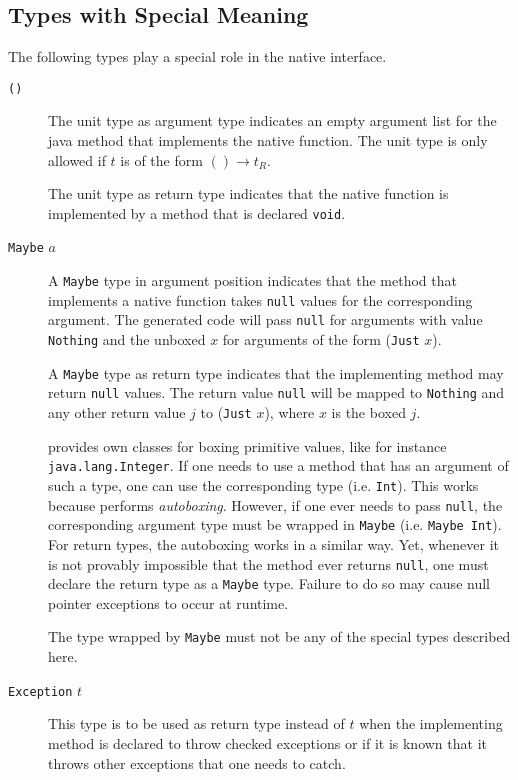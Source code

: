 \subsection*{Types with Special Meaning}

The following types play a special role in the native interface.

\begin{description}
\item[\texttt{()}] The unit type as argument type indicates an empty argument list for the java method that implements the native function. The unit type is only allowed if $t$ is of the form $() \rightarrow t_R$.

The unit type as return type indicates that the native function is implemented by a \java{} method that is declared \texttt{void}.

\item[\texttt{Maybe} $a$] A \texttt{Maybe} type in argument position indicates that the \java{} method that implements a native function takes \texttt{null} values for the corresponding argument. The generated code will pass \texttt{null} for arguments with value \texttt{Nothing} and the unboxed $x$ for arguments of the form (\texttt{Just} $x$).

A \texttt{Maybe} type as return type indicates that the implementing method may return \texttt{null} values. The return value \texttt{null} will be mapped to \texttt{Nothing} and any other return value $j$ to (\texttt{Just} $x$), where $x$ is the boxed $j$.

\java{} provides own classes for boxing primitive values, like for instance \texttt{java.lang.Integer}. If one needs to use a method that has an argument of such a type, one can use the corresponding \frege{} type (i.e. \texttt{Int}). This works because \java{} performs \emph{autoboxing}. However, if one ever needs to pass \texttt{null}, the corresponding argument type must be wrapped in \texttt{Maybe} (i.e. \texttt{Maybe Int}). For return types, the autoboxing works in a similar way. Yet, whenever it is not provably impossible that the method ever returns \texttt{null}, one must declare the return type as a \texttt{Maybe} type. Failure to do so may cause null pointer exceptions to occur at runtime.

The type wrapped by \texttt{Maybe} must not be any of the special types described here.

\item[\texttt{Exception} $t$] This type is to be used as return type instead of $t$ when the implementing method is declared to throw checked exceptions or if it is known that it throws other exceptions that one needs to catch.


\end{description}
